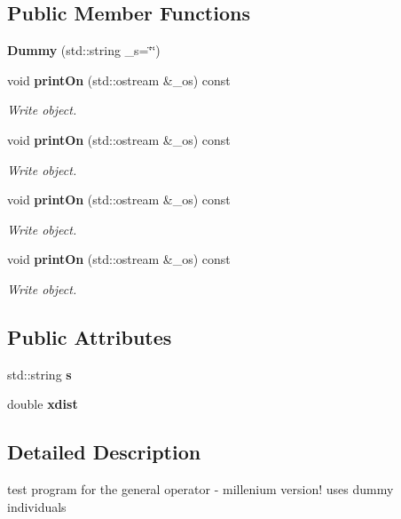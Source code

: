 \subsection*{Public Member Functions}
\begin{CompactItemize}
\item 
{\bf Dummy} (std::string \_\-s=\char`\"{}\char`\"{})\label{struct_dummy_a0}

\item 
void {\bf print\-On} (std::ostream \&\_\-os) const 
\begin{CompactList}\small\item\em Write object. \item\end{CompactList}\item 
void {\bf print\-On} (std::ostream \&\_\-os) const 
\begin{CompactList}\small\item\em Write object. \item\end{CompactList}\item 
void {\bf print\-On} (std::ostream \&\_\-os) const 
\begin{CompactList}\small\item\em Write object. \item\end{CompactList}\item 
void {\bf print\-On} (std::ostream \&\_\-os) const 
\begin{CompactList}\small\item\em Write object. \item\end{CompactList}\end{CompactItemize}
\subsection*{Public Attributes}
\begin{CompactItemize}
\item 
std::string {\bf s}\label{struct_dummy_o0}

\item 
double {\bf xdist}\label{struct_dummy_o1}

\end{CompactItemize}


\subsection{Detailed Description}
test program for the general operator - millenium version! uses dummy individuals 



